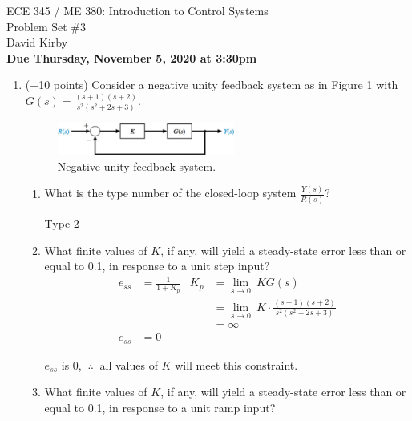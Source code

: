 \documentclass[11pt]{article}
\begin{document}
\begin{center}
\LARGE{ECE 345 / ME 380: Introduction to Control Systems\\Problem Set \#3}\\[1.5em]
\large David Kirby\\[1.5em]
\large \textbf{Due Thursday, November 5, 2020 at 3:30pm}\\[2.5em]
\end{center}

\begin{enumerate}
    \item (+10 points) Consider a negative unity feedback system as in Figure 1 with \( G(s)=\displaystyle\frac{(s+1)(s+2)}{s^2(s^2 + 2s + 3)} \).
    \begin{figure}[h!]
    \centering
    \includegraphics[width=0.55\textwidth]{./Images/Fig04-001.png}
    \caption{Negative unity feedback system.}
    \end{figure}
    \begin{enumerate}
        \item What is the type number of the closed-loop system \(\frac{Y(s)}{R(s)}\)?
        \begin{center}
            Type 2
        \end{center}
        \item What finite values of \(K\), if any, will yield a steady-state error less than or equal to 0.1, in response to a unit step input?
        \begin{align*}
            e_{ss} &=\frac{1}{1+K_p} &K_p &= \lim_{s \to 0}\ KG(s)\\
            &&&=\lim_{s \to 0}\ K\cdot \displaystyle\frac{(s+1)(s+2)}{s^2(s^2 + 2s + 3)}\\
            &&&=\infty\\
            e_{ss} &=0
        \end{align*}
        \begin{center}
            \(e_{ss}\) is 0, \(\ \therefore\ \) all values of \(K\) will meet this constraint.
        \end{center}
        \item What ﬁnite values of \(K\), if any, will yield a steady-state error less than or equal to 0.1, in response to a unit ramp input?

\end{enumerate}
\end{enumerate}
\end{document}
